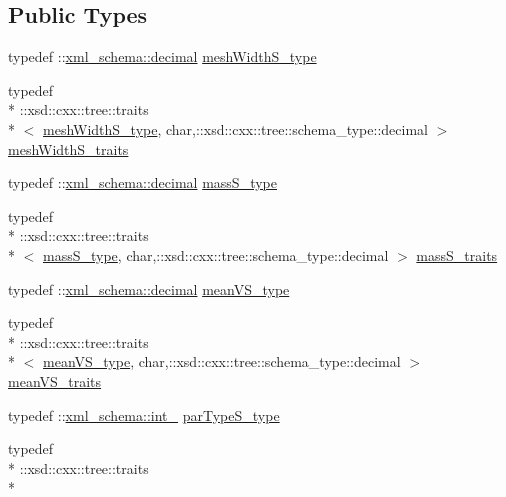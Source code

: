 \subsection*{Public Types}
\begin{DoxyCompactItemize}
\item 
typedef \-::\hyperlink{namespacexml__schema_a69bfaf24f63a8c18ebd8e21db6b343df}{xml\-\_\-schema\-::decimal} \hyperlink{classsphere__t_a82740a9c5aa0437d973ee3e3caad09ea}{mesh\-Width\-S\-\_\-type}
\item 
typedef \\*
\-::xsd\-::cxx\-::tree\-::traits\\*
$<$ \hyperlink{classsphere__t_a82740a9c5aa0437d973ee3e3caad09ea}{mesh\-Width\-S\-\_\-type}, char,\-::xsd\-::cxx\-::tree\-::schema\-\_\-type\-::decimal $>$ \hyperlink{classsphere__t_a2efcf8f1a1ebfa301c88d3ffa429d1cd}{mesh\-Width\-S\-\_\-traits}
\item 
typedef \-::\hyperlink{namespacexml__schema_a69bfaf24f63a8c18ebd8e21db6b343df}{xml\-\_\-schema\-::decimal} \hyperlink{classsphere__t_a317ddc20b1a4fa225c55721bf12c67b2}{mass\-S\-\_\-type}
\item 
typedef \\*
\-::xsd\-::cxx\-::tree\-::traits\\*
$<$ \hyperlink{classsphere__t_a317ddc20b1a4fa225c55721bf12c67b2}{mass\-S\-\_\-type}, char,\-::xsd\-::cxx\-::tree\-::schema\-\_\-type\-::decimal $>$ \hyperlink{classsphere__t_a7cab3fa5c1e9b5a04581b0262c9f5e5d}{mass\-S\-\_\-traits}
\item 
typedef \-::\hyperlink{namespacexml__schema_a69bfaf24f63a8c18ebd8e21db6b343df}{xml\-\_\-schema\-::decimal} \hyperlink{classsphere__t_a351152e9b83bac409a627037b99a209b}{mean\-V\-S\-\_\-type}
\item 
typedef \\*
\-::xsd\-::cxx\-::tree\-::traits\\*
$<$ \hyperlink{classsphere__t_a351152e9b83bac409a627037b99a209b}{mean\-V\-S\-\_\-type}, char,\-::xsd\-::cxx\-::tree\-::schema\-\_\-type\-::decimal $>$ \hyperlink{classsphere__t_a1ff4a5faedc4d9d2b8f4063516997840}{mean\-V\-S\-\_\-traits}
\item 
typedef \-::\hyperlink{namespacexml__schema_acfa24ac68e1a188e7f44c36f7a158bf4}{xml\-\_\-schema\-::int\-\_\-} \hyperlink{classsphere__t_a750fe86f76f8c344ccb25e7dc73c2655}{par\-Type\-S\-\_\-type}
\item 
typedef \\*
\-::xsd\-::cxx\-::tree\-::traits\\*

\end{DoxyCompactItemize}
